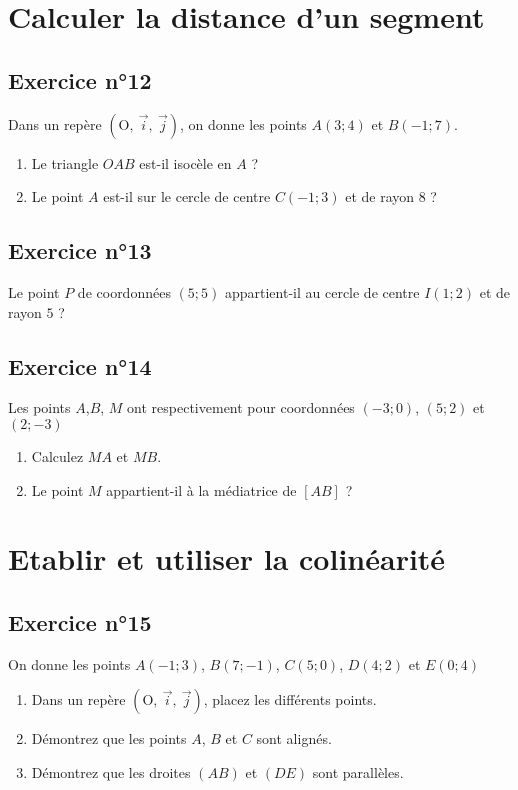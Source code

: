 \documentclass[12pt,a4paper]{article}
\def\Oij{$\left(\text{O},~\vec{i},~\vec{j}\right)$}
\begin{document}
\section{Calculer la distance d'un segment}

    
\subsection*{Exercice n°12}    
Dans un repère \Oij{}, on donne les points $A(3;4)$ et $B(-1;7)$.

\begin{enumerate}
    \item Le triangle $OAB$ est-il isocèle en $A$ ?
    \item Le point $A$ est-il sur le cercle de centre $C(-1;3)$ et de rayon $8$ ?
\end{enumerate}

\subsection*{Exercice n°13}
Le point $P$ de coordonnées $(5;5)$ appartient-il au cercle de centre $I(1;2)$ et de rayon $5$ ? 

\subsection*{Exercice n°14}

Les points $A$,$B$, $M$ ont respectivement pour coordonnées $(-3;0)$, $(5;2)$ et $(2;-3)$
\begin{enumerate}
    \item Calculez $MA$ et $MB$.
    \item Le point $M$ appartient-il à la médiatrice de $[AB]$ ?
\end{enumerate}

\section{Etablir et utiliser la colinéarité}

\subsection*{Exercice n°15}

On donne les points $A(-1;3)$, $B(7;-1)$, $C(5;0)$, $D(4;2)$ et $E(0;4)$
\begin{enumerate}
    \item Dans un repère \Oij{}, placez les différents points.
    \item Démontrez que les points $A$, $B$ et $C$ sont alignés.
    \item Démontrez que les droites $(AB)$ et $(DE)$ sont parallèles.
\end{enumerate}
\end{document}
